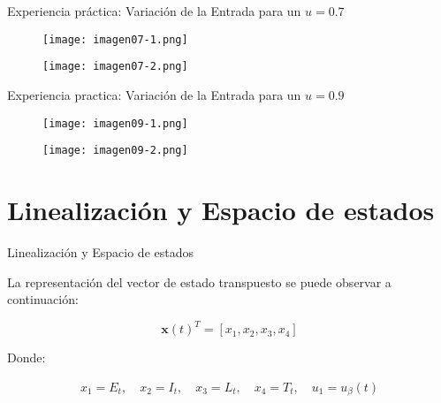 \documentclass{beamer}
\begin{document}
\begin{frame}{Experiencia práctica: Variación de la Entrada para un $u=0.7$}
\begin{justify}
\small
{\footnotesize
\begin{figure}[H]
\centering
\texttt{[image: imagen07-1.png]}
\captionsetup{justification=centering}
\label{C2}
\end{figure}

\begin{figure}[H]
\centering
\texttt{[image: imagen07-2.png]}
\captionsetup{justification=centering}
\label{C2}
\end{figure}
}
\end{justify}
\end{frame}

\begin{frame}{Experiencia practica: Variación de la Entrada para un $u=0.9$}
\begin{justify}
\small
{\footnotesize
\begin{figure}[H]
\centering
\texttt{[image: imagen09-1.png]}
\captionsetup{justification=centering}
\label{C2}
\end{figure}

\begin{figure}[H]
\centering
\texttt{[image: imagen09-2.png]}
\captionsetup{justification=centering}
\label{C2}
\end{figure}
}
\end{justify}
\end{frame}

\section{Linealización y Espacio de estados}
\begin{frame}{Linealización y Espacio de estados}
\begin{justify}
\vspace{0.3cm}
La representación del vector de estado transpuesto se puede observar a continuación:

$$
\mathbf{x}(t)^T = [x_1, x_2, x_3, x_4]
$$

Donde:

\begin{align*}
x_1 = E_t, \quad
x_2 = I_t, \quad
x_3 = L_t, \quad
x_4 = T_t, \quad
u_1 = u_{\beta}(t)
\end{align*}



\end{justify}
\end{frame}
\end{document}
